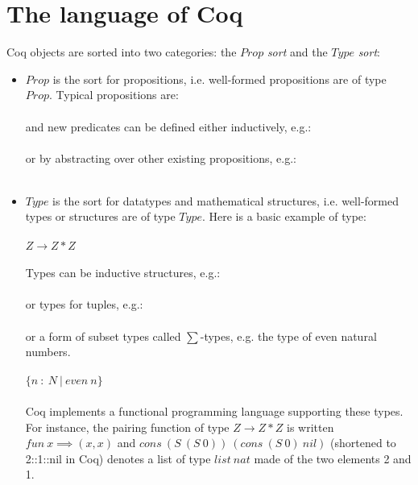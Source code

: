 \section{The language of Coq}
Coq objects are sorted into two categories: the $Prop$ \emph{sort} and the $Type$ \emph{sort}:
\begin{itemize}
\item $Prop$ is the sort for propositions, i.e. well-formed propositions are of type $Prop$. Typical propositions are: \\\\

\vspace{1em}
and new predicates can be defined either inductively, e.g.: \\\\

\vspace{1em}
or by abstracting over other existing propositions, e.g.: \\\\

\vspace{1em}
\item $Type$ is the sort for datatypes and mathematical structures, i.e. well-formed types or structures are of type $Type$. Here is a basic example of type: \\\\
$Z \rightarrow Z * Z$ \\\\
Types can be inductive structures, e.g.: \\\\

\vspace{1em}
or types for tuples, e.g.: \\\\

\vspace{1em}
or a form of subset types called $\sum$-types, e.g. the type of even natural numbers. \\\\
$\{n\: :\: N\: |\: even\: n\}$ \\\\
Coq implements a functional programming language supporting these types. For instance, the pairing function of type $Z \rightarrow Z * Z$ is written $fun\: x \implies (x,x)$ and $cons\: (S\: (S\: 0))\: (cons\: (S\: 0)\: nil)$ (shortened to 2::1::nil in Coq) denotes a list of type $list\: nat$ made of the two elements 2 and 1. \\\\

\end{itemize}
